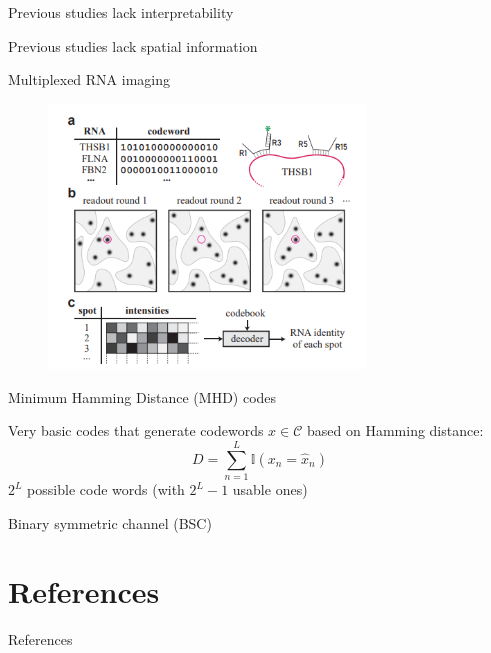 \documentclass{beamer}					%
\begin{document}
\begin{frame}{Previous studies lack interpretability}

\end{frame}

\begin{frame}{Previous studies lack spatial information}

\end{frame}

\begin{frame}{Multiplexed RNA imaging}

\begin{figure}
\begin{center}
\includegraphics[width=0.75\textwidth]{merfish}
\end{center}
\caption{}
\end{figure}

\end{frame}

\begin{frame}{Minimum Hamming Distance (MHD) codes}

Very basic codes that generate codewords $x\in\mathcal{C}$ based on Hamming distance: 
\begin{equation*}
D = \sum_{n=1}^{L} \mathbb{I}(x_{n}=\hat{x}_{n})
\end{equation*}
$2^{L}$ possible code words (with $2^{L}-1$ usable ones) 

\end{frame}

\begin{frame}{Binary symmetric channel (BSC)}



\end{frame}




\section{References}

\begin{frame}[allowframebreaks]{References}
	\tiny
	
\end{frame}
\end{document}

